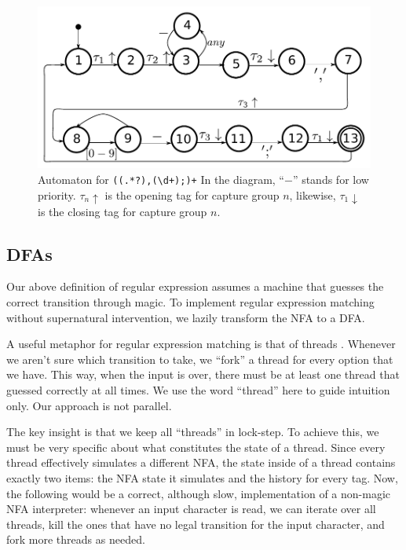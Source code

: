 \documentclass[english]{sigplanconf}
\theoremstyle{definition}
\begin{document}
\begin{figure}
\includegraphics[width=\linewidth]{graphs/lehrer_automaton}

\caption{\label{fig:example-automaton}
Automaton for \texttt{((.*?),(\textbackslash{}d+);)+} 
In the diagram, ``$-$'' stands for low priority. $\tau_n\uparrow$ is the opening tag for capture group $n$, likewise, $\tau_1\downarrow$ is the closing tag for capture group $n$.}
\end{figure}

\subsection{DFAs}

Our above definition of regular expression assumes a machine that
guesses the correct transition through magic. To implement regular
expression matching without supernatural intervention, we lazily transform
the NFA to a DFA. 

A useful metaphor for regular expression matching is that of threads
\cite{Cox07a}. Whenever we aren't sure which transition to take,
we ``fork'' a thread for every option that we have. This way, when
the input is over, there must be at least one thread that guessed
correctly at all times. We use the word ``thread'' here to guide
intuition only. Our approach is not parallel. 

The key insight is that we keep all ``threads'' in lock-step. To
achieve this, we must be very specific about what constitutes the
state of a thread. Since every thread effectively simulates a different
NFA, the state inside of a thread contains exactly two items: the
NFA state it simulates and the history for every tag. Now, the following
would be a correct, although slow, implementation of a non-magic NFA
interpreter: whenever an input character is read, we can iterate over
all threads, kill the ones that have no legal transition for the input
character, and fork more threads as needed.
\end{document}
